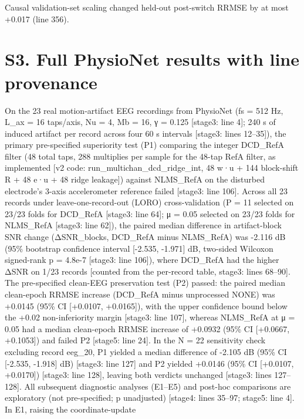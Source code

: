 \documentclass[
  9pt,
]{article}
\begin{document}
Causal validation-set scaling changed held-out post-switch RRMSE by at
most +0.017 (line 356).

\hypertarget{s3.-full-physionet-results-with-line-provenance}{%
\section{S3. Full PhysioNet results with line
provenance}\label{s3.-full-physionet-results-with-line-provenance}}

On the 23 real motion-artifact EEG recordings from PhysioNet (fs = 512
Hz, L\_ax = 16 taps/axis, Nu = 4, Mb = 16, γ = 0.125 {[}stage3: line
4{]}; 240 s of induced artifact per record across four 60 s intervals
{[}stage3: lines 12--35{]}), the primary pre-specified superiority test
(P1) comparing the integer DCD\_RefA filter (48 total taps, 288
multiplies per sample for the 48-tap RefA filter, as implemented {[}v2
code: run\_multichan\_dcd\_ridge\_int, 48 w·u + 144 block-shift R + 48
e·u + 48 ridge leakage{]}) against NLMS\_RefA on the disturbed
electrode's 3-axis accelerometer reference failed {[}stage3: line
106{]}. Across all 23 records under leave-one-record-out (LORO)
cross-validation (P = 11 selected on 23/23 folds for DCD\_RefA
{[}stage3: line 64{]}; μ = 0.05 selected on 23/23 folds for NLMS\_RefA
{[}stage3: line 62{]}), the paired median difference in artifact-block
SNR change (ΔSNR\_blocks, DCD\_RefA minus NLMS\_RefA) was -2.116 dB
(95\% bootstrap confidence interval {[}-2.535, -1.971{]} dB, two-sided
Wilcoxon signed-rank p = 4.8e-7 {[}stage3: line 106{]}), where DCD\_RefA
had the higher ΔSNR on 1/23 records {[}counted from the per-record
table, stage3: lines 68--90{]}. The pre-specified clean-EEG preservation
test (P2) passed: the paired median clean-epoch RRMSE increase
(DCD\_RefA minus unprocessed NONE) was +0.0145 (95\% CI {[}+0.0107,
+0.0165{]}), with the upper confidence bound below the +0.02
non-inferiority margin {[}stage3: line 107{]}, whereas NLMS\_RefA at μ =
0.05 had a median clean-epoch RRMSE increase of +0.0932 (95\% CI
{[}+0.0667, +0.1053{]}) and failed P2 {[}stage5: line 24{]}. In the N =
22 sensitivity check excluding record eeg\_20, P1 yielded a median
difference of -2.105 dB (95\% CI {[}-2.535, -1.918{]} dB) {[}stage3:
line 127{]} and P2 yielded +0.0146 (95\% CI {[}+0.0107, +0.0170{]})
{[}stage3: line 128{]}, leaving both verdicts unchanged {[}stage3: lines
127--128{]}. All subsequent diagnostic analyses (E1--E5) and post-hoc
comparisons are exploratory (not pre-specified; p unadjusted) {[}stage4:
lines 35--97; stage5: line 4{]}. In E1, raising the coordinate-update
\end{document}
